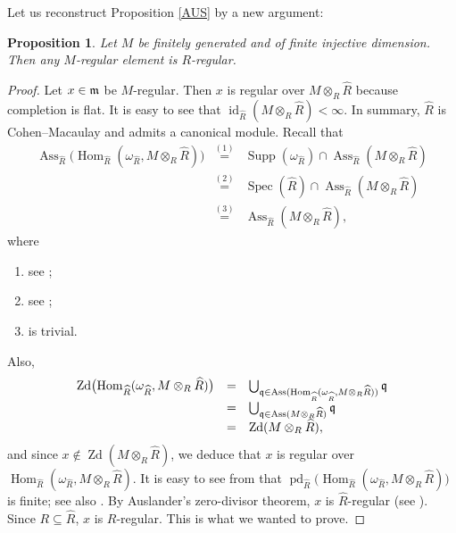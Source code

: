 \documentclass[10. pt,a4paper]{amsart}
\newtheorem{proposition}[theorem]{Proposition}
\theoremstyle{definition}
\theoremstyle{remark}
\newcommand{\Ass}{\operatorname{Ass}}
\newcommand{\Spec}{\operatorname{Spec}}
\newcommand{\id}{\operatorname{id}}
\newcommand{\pd}{\operatorname{pd}}
\newcommand{\Supp}{\operatorname{Supp}}
\newcommand{\Hom}{\operatorname{Hom}}
\newcommand{\Zd}{\operatorname{Zd}}
\newcommand{\fm}{\frak{m}}
\newcommand{\fq}{\frak{q}}
\begin{document}
Let us reconstruct Proposition \ref{AUS} by a new argument:

\begin{proposition}\label{sh}
	Let $M$ be finitely generated and of finite injective dimension. Then any $M$-regular element is $R$-regular.
\end{proposition}

\begin{proof}
	Let $x \in \fm$ be $M$-regular. Then $x$ is regular over $M \otimes_R \widehat{R}$ because completion is flat. It is easy to see that $\id_{\widehat{R}}(M \otimes_R \widehat{R}) < \infty$. In summary, $\widehat{R}$ is Cohen--Macaulay and admits a canonical module.
	Recall that
	\[
	\begin{array}{rcl}
	\Ass_{\widehat{R}}\bigl(\Hom_{\widehat{R}}(\omega_{\widehat{R}}, M \otimes_R \widehat{R})\bigr)
	& \stackrel{(1)}{=} & \Supp(\omega_{\widehat{R}}) \cap \Ass_{\widehat{R}}(M \otimes_R \widehat{R}) \\
	& \stackrel{(2)}{=} & \Spec(\widehat{R}) \cap \Ass_{\widehat{R}}(M \otimes_R \widehat{R}) \\
	& \stackrel{(3)}{=} & \Ass_{\widehat{R}}(M \otimes_R \widehat{R}),
	\end{array}
	\]
	where
	\begin{enumerate}
		\item[(1)] see \cite[1.2.27]{BH};
		\item[(2)] see \cite[Theorem 3.3.5(b)]{BH};
		\item[(3)] is trivial.
	\end{enumerate}
	Also,
	\[
	\begin{array}{rcl}
	\Zd\bigl(\Hom_{\widehat{R}}(\omega_{\widehat{R}}, M \otimes_R \widehat{R})\bigr)
	& = & \bigcup_{\fq \in \Ass(\Hom_{\widehat{R}}(\omega_{\widehat{R}}, M \otimes_R \widehat{R}))} \fq \\
	& = & \bigcup_{\fq \in \Ass(M \otimes_R \widehat{R})} \fq \\
	& = & \Zd(M \otimes_R \widehat{R}),
	\end{array}
	\]
	and since $x \notin \Zd(M \otimes_R \widehat{R})$, we deduce that $x$ is regular over $\Hom_{\widehat{R}}(\omega_{\widehat{R}}, M \otimes_R \widehat{R})$.
	It is easy to see from \cite{sha} that $\pd_{\widehat{R}}\bigl(\Hom_{\widehat{R}}(\omega_{\widehat{R}}, M \otimes_R \widehat{R})\bigr)$ is finite; see also \cite[9.6.5(b)]{BH}. By Auslander's zero-divisor theorem, $x$ is $\widehat{R}$-regular (see \cite[Theorem 9.4.7]{BH}). Since $R \subseteq \widehat{R}$, $x$ is $R$-regular. This is what we wanted to prove.
\end{proof}
\end{document}
